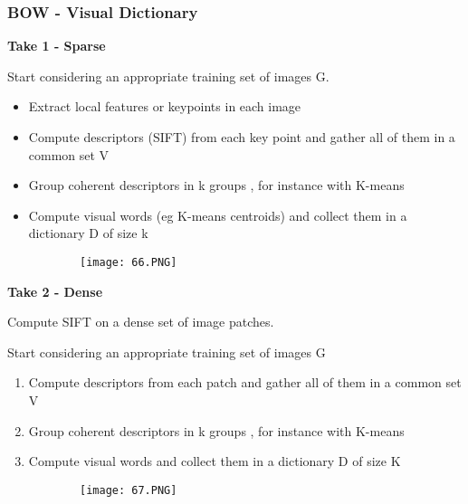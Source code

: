 \documentclass{article}
\begin{document}
\vspace{100mm}

\subsubsection{BOW - Visual Dictionary}

\textbf{Take 1 - Sparse}

Start considering an appropriate training set of images G.

\begin{itemize}
    \item Extract local features or keypoints in each image
    \item Compute descriptors (SIFT) from each key point and gather all of them in a common set V
    \item Group coherent descriptors in k groups , for instance with K-means
    \item Compute visual words (eg K-means centroids) and collect them in a dictionary D of size k
\end{itemize}

\begin{figure}[ht!]
  \centering
  \begin{subfigure}[b]{0.4\linewidth}
    \texttt{[image: 66.PNG]}
  \end{subfigure}
\end{figure}

\textbf{Take 2 - Dense}

Compute SIFT on a dense set of image patches.

Start considering an appropriate training set of images G

\begin{enumerate}
    \item Compute descriptors from each patch and gather all of them in a common set V
    \item Group coherent descriptors in k groups , for instance with K-means
    \item Compute visual words and collect them in a dictionary D of size K
\end{enumerate}

\begin{figure}[ht!]
  \centering
  \begin{subfigure}[b]{0.4\linewidth}
    \texttt{[image: 67.PNG]}
  \end{subfigure}
\end{figure}
\end{document}

